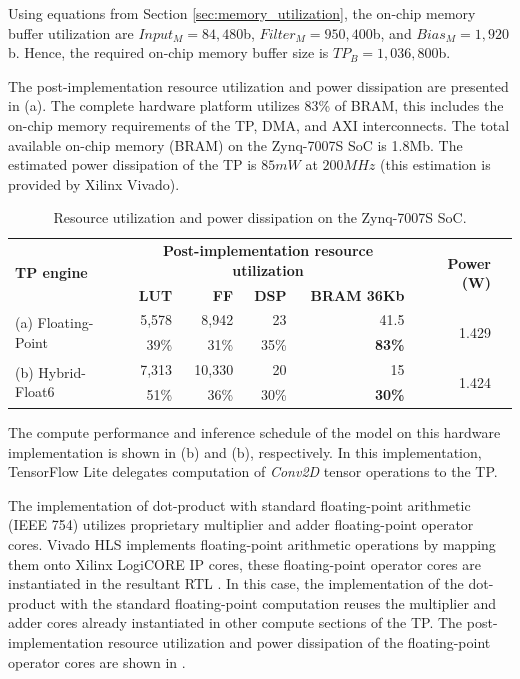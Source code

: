Using equations from Section \ref{sec:memory_utilization}, the on-chip memory buffer utilization are $Input_M=84,480$b, $Filter_M=950,400$b, and $Bias_M=1,920$b. Hence, the required on-chip memory buffer size is $TP_B=1,036,800$b.

The post-implementation resource utilization and power dissipation are presented in (a). The complete hardware platform utilizes 83\% of BRAM, this includes the on-chip memory requirements of the TP, DMA, and AXI interconnects. The total available on-chip memory (BRAM) on the Zynq-7007S SoC is 1.8Mb. The estimated power dissipation of the TP is $85mW$ at $200MHz$ (this estimation is provided by Xilinx Vivado).

\begin{table}[!h]\centering
	\caption{Resource utilization and power dissipation on the Zynq-7007S SoC.}\label{tab:resource_utilization}
	\scriptsize
	\begin{tabular}{lrrrrrr}\toprule
		\multirow{2}{*}{\textbf{TP engine}} &\multicolumn{4}{c}{\textbf{Post-implementation resource utilization}} &\multirow{2}{*}{\textbf{Power (W)}} \\\cmidrule{2-5}
		&\textbf{LUT} &\textbf{FF} &\textbf{DSP} &\textbf{BRAM 36Kb} & \\\midrule
		\multirow{2}{*}{(a) Floating-Point} &5,578 &8,942 &23 &41.5 &\multirow{2}{*}{1.429} \\
		&39\% &31\% &35\% &\textbf{83\%} & \\
		\multirow{2}{*}{(b) Hybrid-Float6} &7,313 &10,330 &20 &15 &\multirow{2}{*}{1.424} \\
		&51\% &36\% &30\% &\textbf{30\%} & \\
		\bottomrule
	\end{tabular}
\end{table}

The compute performance and inference schedule of the model on this hardware implementation is shown in (b) and (b), respectively. In this implementation, TensorFlow Lite delegates computation of \emph{Conv2D} tensor operations to the TP.

The implementation of dot-product with standard floating-point arithmetic (IEEE 754) utilizes proprietary multiplier and adder floating-point operator cores. Vivado HLS implements floating-point arithmetic operations by mapping them onto Xilinx LogiCORE IP cores, these floating-point operator cores are instantiated in the resultant RTL \cite{hrica2012floating}. In this case, the implementation of the dot-product with the standard floating-point computation reuses the multiplier and adder cores already instantiated in other compute sections of the TP. The post-implementation resource utilization and power dissipation of the floating-point operator cores are shown in .

